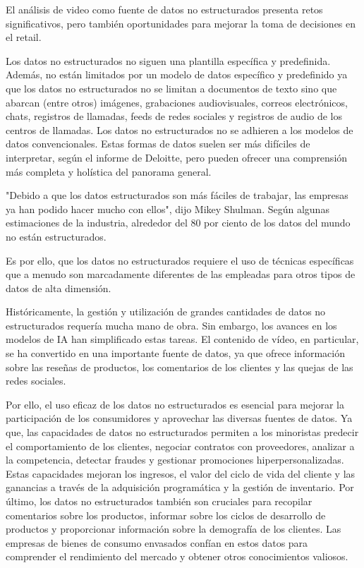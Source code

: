 El análisis de video como fuente de datos no estructurados presenta retos significativos, pero también oportunidades para mejorar la toma de decisiones en el retail. 

Los datos no estructurados no siguen una plantilla específica y predefinida. Además, no están limitados por un modelo de datos específico y predefinido ya que los datos no estructurados no se limitan a documentos de texto sino que abarcan (entre otros) imágenes, grabaciones audiovisuales, correos electrónicos, chats, registros de llamadas, feeds de redes sociales y registros de audio de los centros de llamadas. Los datos no estructurados no se adhieren a los modelos de datos convencionales. Estas formas de datos suelen ser más difíciles de interpretar, según el informe de Deloitte, pero pueden ofrecer una comprensión más completa y holística del panorama general. 

"Debido a que los datos estructurados son más fáciles de trabajar, las empresas ya han podido hacer mucho con ellos", dijo Mikey Shulman. Según algunas estimaciones de la industria, alrededor del 80 por ciento de los datos del mundo no están estructurados.

Es por ello, que los datos no estructurados requiere el uso de técnicas específicas que a menudo son marcadamente diferentes de las empleadas para otros tipos de datos de alta dimensión.

Históricamente, la gestión y utilización de grandes cantidades de datos no estructurados requería mucha mano de obra. Sin embargo, los avances en los modelos de IA han simplificado estas tareas. El contenido de vídeo, en particular, se ha convertido en una importante fuente de datos, ya que ofrece información sobre las reseñas de productos, los comentarios de los clientes y las quejas de las redes sociales.

Por ello, el uso eficaz de los datos no estructurados es esencial para mejorar la participación de los consumidores y aprovechar las diversas fuentes de datos. Ya que, las capacidades de datos no estructurados permiten a los minoristas predecir el comportamiento de los clientes, negociar contratos con proveedores, analizar a la competencia, detectar fraudes y gestionar promociones hiperpersonalizadas. Estas capacidades mejoran los ingresos, el valor del ciclo de vida del cliente y las ganancias a través de la adquisición programática y la gestión de inventario. Por último, los datos no estructurados también son cruciales para recopilar comentarios sobre los productos, informar sobre los ciclos de desarrollo de productos y proporcionar información sobre la demografía de los clientes. Las empresas de bienes de consumo envasados confían en estos datos para comprender el rendimiento del mercado y obtener otros conocimientos valiosos.

